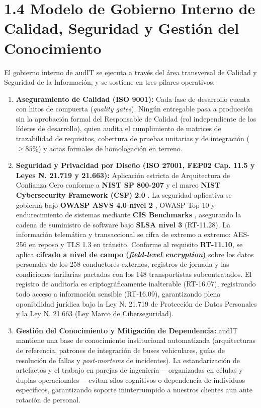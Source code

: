 \section{1.4 Modelo de Gobierno Interno de Calidad, Seguridad y Gestión del Conocimiento}

El gobierno interno de audIT se ejecuta a través del área transversal de Calidad y Seguridad de la Información, y se sostiene en tres pilares operativos:

\begin{enumerate}
    \item \textbf{Aseguramiento de Calidad (ISO 9001):} Cada fase de desarrollo cuenta con hitos de compuerta (\emph{quality gates}). Ningún entregable pasa a producción sin la aprobación formal del Responsable de Calidad (rol independiente de los líderes de desarrollo), quien audita el cumplimiento de matrices de trazabilidad de requisitos, cobertura de pruebas unitarias y de integración ($\ge 85\%$) y actas formales de homologación en terreno.
    
    \item \textbf{Seguridad y Privacidad por Diseño (ISO 27001, FEP02 Cap. 11.5 y Leyes N.\textordmasculine{} 21.719 y 21.663):} Aplicación estricta de Arquitectura de Confianza Cero conforme a \textbf{NIST SP 800-207} \parencite{nist_sp800_207} y el marco \textbf{NIST Cybersecurity Framework (CSF) 2.0} \parencite{nist_csf2}. La seguridad aplicativa se gobierna bajo \textbf{OWASP ASVS 4.0 nivel 2} \parencite{owasp_asvs}, OWASP Top 10 y endurecimiento de sistemas mediante \textbf{CIS Benchmarks} \parencite{cis_benchmarks}, asegurando la cadena de suministro de software bajo \textbf{SLSA nivel 3} (RT-11.28). La información telemática y transaccional se cifra de extremo a extremo: AES-256 en reposo y TLS 1.3 en tránsito. Conforme al requisito \textbf{RT-11.10}, se aplica \textbf{cifrado a nivel de campo (\emph{field-level encryption})} sobre los datos personales de los 258 conductores externos, registros de jornada y las condiciones tarifarias pactadas con los 148 transportistas subcontratados. El registro de auditoría es criptográficamente inalterable (RT-16.07), registrando todo acceso a información sensible (RT-16.09), garantizando plena oponibilidad jurídica bajo la Ley N.\textordmasculine{} 21.719 \parencite{ley21719} de Protección de Datos Personales y la Ley N.\textordmasculine{} 21.663 \parencite{ley21663} (Ley Marco de Ciberseguridad).
    
    \item \textbf{Gestión del Conocimiento y Mitigación de Dependencia:} audIT mantiene una base de conocimiento institucional automatizada (arquitecturas de referencia, patrones de integración de buses vehiculares, guías de resolución de fallas y \emph{post-mortems} de incidentes). La estandarización de artefactos y el trabajo en parejas de ingeniería ---organizadas en células y duplas operacionales--- evitan silos cognitivos o dependencia de individuos específicos, garantizando soporte ininterrumpido a nuestros clientes aun ante rotación de personal.
\end{enumerate}

